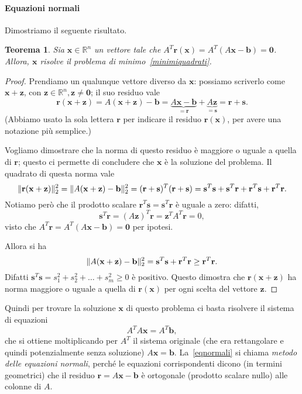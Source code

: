 \documentclass[a4paper]{report}
\DeclarePairedDelimiter{\norm}{\lVert}{\rVert}
\newtheorem{theorem}{Teorema}[chapter]
\theoremstyle{definiton}
\theoremstyle{remark}
\newcommand{\x}{\mathbf{x}}
\newcommand{\z}{\mathbf{z}}
\renewcommand{\b}{\mathbf{b}}
\begin{document}
\paragraph{Equazioni normali}  Dimostriamo il seguente risultato.
\begin{theorem}
Sia $\x\in\mathbb{R}^n$ un vettore tale che $A^T \mathbf{r}(\x) = A^T(A\x-\b) = \mathbf{0}$. Allora, $\x$ risolve il problema di minimo~\eqref{minimiquadrati}.
\end{theorem}
\begin{proof}
Prendiamo un qualunque vettore diverso da $\x$: possiamo scriverlo come $\x+\mathbf{z}$, con $\mathbf{z}\in\mathbb{R}^n, \mathbf{z} \neq \mathbf{0}$; il suo residuo vale
\[
\mathbf{r}(\x+\mathbf{z}) =  A(\x+\mathbf{z})-\b = \underbrace{A\x-\b}_{=\mathbf{r}} + \underbrace{A\mathbf{z}}_{=\mathbf{s}} = \mathbf{r}+\mathbf{s}.
\]
(Abbiamo usato la sola lettera $\mathbf{r}$ per indicare il residuo $\mathbf{r}(\x)$, per avere una notazione più semplice.)

Vogliamo dimostrare che la norma di questo residuo è maggiore o uguale a quella di $\mathbf{r}$; questo ci permette di concludere che $\x$ è la soluzione del problema. Il quadrato di questa norma vale
\[
\norm{\mathbf{r}(\x+\mathbf{z})}_2^2 = \norm{A(\x+\mathbf{z})-\b}_2^2 = (\mathbf{r}+\mathbf{s})^T(\mathbf{r}+\mathbf{s}) = \mathbf{s}^T \mathbf{s} + \mathbf{s}^T\mathbf{r} + \mathbf{r}^T \mathbf{s} + \mathbf{r}^T \mathbf{r}.
\]
Notiamo però che il prodotto scalare $\mathbf{r}^T\mathbf{s} = \mathbf{s}^T\mathbf{r}$ è uguale a zero: difatti,
\[
\mathbf{s}^T \mathbf{r} = (A\mathbf{z})^T \mathbf{r} = \mathbf{z}^T A^T \mathbf{r} = 0,
\]
visto che $A^T\mathbf{r} = A^T(A\x-\b) = \mathbf{0}$ per ipotesi.

Allora si ha
\[
\norm{A(\x+\mathbf{z})-\b}_2^2 = \mathbf{s}^T \mathbf{s} + \mathbf{r}^T \mathbf{r} \geq \mathbf{r}^T\mathbf{r}.
\]
Difatti $\mathbf{s}^T\mathbf{s} = s_1^2 + s_2^2 + \dots + s_m^2 \geq 0$ è positivo. Questo dimostra che $\mathbf{r}(\x +\mathbf{z})$ ha norma maggiore o uguale a quella di $\mathbf{r}(\x)$ per ogni scelta del vettore $\z$.
\end{proof}
Quindi per trovare la soluzione $\x$ di questo problema ci basta risolvere il sistema di equazioni
\begin{equation} \label{eqnormali}
    A^T A \x = A^T \b,    
\end{equation}
che si ottiene moltiplicando per $A^T$ il sistema originale (che era rettangolare e quindi potenzialmente senza soluzione) $A \x= \b$. La~\eqref{eqnormali} si chiama \emph{metodo delle equazioni normali}, perché le equazioni corrispondenti dicono (in termini geometrici) che il residuo $\mathbf{r}=A \x-\b$ è ortogonale (prodotto scalare nullo) alle colonne di $A$.
\end{document}
